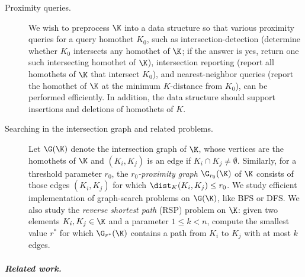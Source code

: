 %
\medskip
\begin{description}
	\item[Proximity queries.] We wish to preprocess $\K$ into a data structure so that 
                various proximity queries for a query homothet $K_0$, such as intersection-detection 
		(determine whether $K_0$ intersects any homothet of $\K$; if the answer is yes, return 
                one such intersecting homothet of $\K$), 
		intersection reporting (report all homothets of $\K$ that intersect $K_0$),
		and nearest-neighbor queries (report the homothet of $\K$ at the 
		minimum $K$-distance from $K_0$),
		can be performed efficiently. In addition, the data structure should 
		support insertions and deletions of homothets of $K$.
	\item[Searching in the intersection graph and related problems.] Let $\G(\K)$ denote the intersection graph 
		of $\K$, whose vertices are the homothets of $\K$ and $(K_i,K_j)$ is an edge if 
		$K_i\cap K_j\ne\emptyset$. Similarly, for a threshold parameter $r_0$, the
                \emph{$r_0$-proximity graph} $\G_{r_0}(\K)$ of $\K$ consists of those edges $(K_i,K_j)$
                for which $\dist_K(K_i,K_j) \le r_0$.
		We study efficient implementation of graph-search problems on $\G(\K)$,
                like BFS or DFS.
		We also study the \emph{reverse shortest path} (RSP) problem on $\K$:
		given two elements $K_i,K_j \in \K$  and a parameter $1 \le k < n$, compute
		the smallest value $r^*$ for which $\G_{r^*}(\K)$
                contains a path from $K_i$ to $K_j$ with at most $k$ edges. 
\end{description}
%
%
\ifsocgproc 
\subparagraph*{Related work.}
\else
